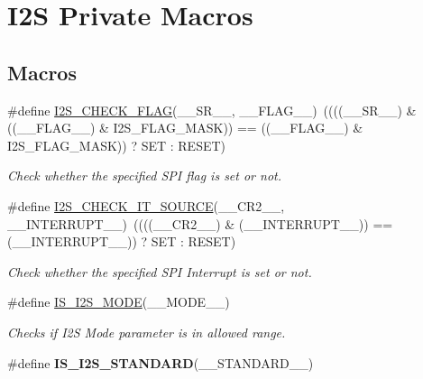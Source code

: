 \hypertarget{group___i2_s___private___macros}{}\section{I2S Private Macros}
\label{group___i2_s___private___macros}
\subsection*{Macros}
\begin{DoxyCompactItemize}
\item 
\#define \hyperlink{group___i2_s___private___macros_ga3964ad318e0958654fae2ff925456826}{I2\+S\+\_\+\+C\+H\+E\+C\+K\+\_\+\+F\+L\+AG}(\+\_\+\+\_\+\+S\+R\+\_\+\+\_\+,  \+\_\+\+\_\+\+F\+L\+A\+G\+\_\+\+\_\+)~((((\+\_\+\+\_\+\+S\+R\+\_\+\+\_\+) \& ((\+\_\+\+\_\+\+F\+L\+A\+G\+\_\+\+\_\+) \& I2\+S\+\_\+\+F\+L\+A\+G\+\_\+\+M\+A\+SK)) == ((\+\_\+\+\_\+\+F\+L\+A\+G\+\_\+\+\_\+) \& I2\+S\+\_\+\+F\+L\+A\+G\+\_\+\+M\+A\+SK)) ? S\+ET \+: R\+E\+S\+ET)
\begin{DoxyCompactList}\small\item\em Check whether the specified S\+PI flag is set or not. \end{DoxyCompactList}\item 
\#define \hyperlink{group___i2_s___private___macros_gadee8d9ff836a0f9328f961c1109f3961}{I2\+S\+\_\+\+C\+H\+E\+C\+K\+\_\+\+I\+T\+\_\+\+S\+O\+U\+R\+CE}(\+\_\+\+\_\+\+C\+R2\+\_\+\+\_\+,  \+\_\+\+\_\+\+I\+N\+T\+E\+R\+R\+U\+P\+T\+\_\+\+\_\+)~((((\+\_\+\+\_\+\+C\+R2\+\_\+\+\_\+) \& (\+\_\+\+\_\+\+I\+N\+T\+E\+R\+R\+U\+P\+T\+\_\+\+\_\+)) == (\+\_\+\+\_\+\+I\+N\+T\+E\+R\+R\+U\+P\+T\+\_\+\+\_\+)) ? S\+ET \+: R\+E\+S\+ET)
\begin{DoxyCompactList}\small\item\em Check whether the specified S\+PI Interrupt is set or not. \end{DoxyCompactList}\item 
\#define \hyperlink{group___i2_s___private___macros_gac8d5e0a3d900566959bb21b70d89a844}{I\+S\+\_\+\+I2\+S\+\_\+\+M\+O\+DE}(\+\_\+\+\_\+\+M\+O\+D\+E\+\_\+\+\_\+)
\begin{DoxyCompactList}\small\item\em Checks if I2S Mode parameter is in allowed range. \end{DoxyCompactList}\item 
\#define {\bfseries I\+S\+\_\+\+I2\+S\+\_\+\+S\+T\+A\+N\+D\+A\+RD}(\+\_\+\+\_\+\+S\+T\+A\+N\+D\+A\+R\+D\+\_\+\+\_\+)
\item 

\end{DoxyCompactItemize}
